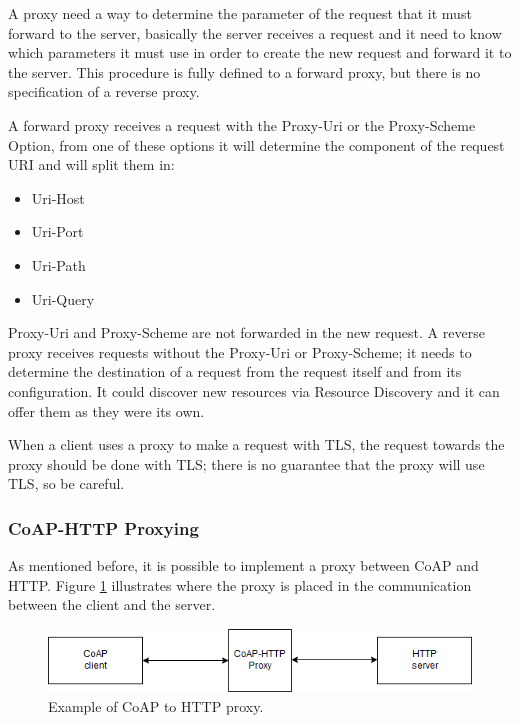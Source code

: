 	A proxy need a way to determine the parameter of the request that it must forward to the server, basically the server receives a request and it need to know which parameters it must use in order to create the new request and forward it to the server.\newline
	This procedure is fully defined to a forward proxy, but there is no specification of a reverse proxy.\newline
	
	A forward proxy receives a request with the Proxy-Uri or the Proxy-Scheme Option, from one of these options it will determine the component of the request URI and will split them in:
	\begin{itemize}
		\item Uri-Host
		\item Uri-Port
		\item Uri-Path
		\item Uri-Query
	\end{itemize}

	Proxy-Uri and Proxy-Scheme are not forwarded in the new request.\newline
	A reverse proxy receives requests without the Proxy-Uri or Proxy-Scheme; it needs to determine the destination of a request from the request itself and from its configuration.\newline
	It could discover new resources via Resource Discovery and it can offer them as they were its own.\newline
	
	When a client uses a proxy to make a request with TLS, the request towards the proxy should be done with TLS; there is no guarantee that the proxy will use TLS, so be careful.\newline
	
	\subsubsection{CoAP-HTTP Proxying}
	As mentioned before, it is possible to implement a proxy between CoAP and HTTP.\newline
	Figure \ref{fig:coap2} illustrates where the proxy is placed in the communication between the client and the server.
	
	\begin{figure}
		\includegraphics[width=\linewidth]{coap-img1.png}
		\caption{Example of CoAP to HTTP proxy.}
		\label{fig:coap2}
	\end{figure}
	
